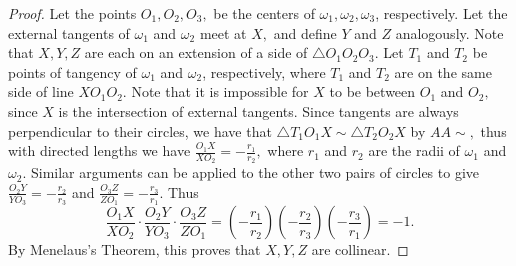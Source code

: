 \documentclass[letterpaper,oneside]{book}
\begin{document}
\begin{proof}
  Let the points $O_1,O_2,O_3,$ be the centers of $\omega_1, \omega_2, \omega_3$, respectively.
  Let the external tangents of $\omega_1$ and $\omega_2$ meet at $X,$ and define $Y$ and $Z$ analogously. Note that $X,Y,Z$ are each on an extension of a side of $\triangle O_1O_2O_3.$ Let $T_1$ and $T_2$ be points of tangency of $\omega_1$ and $\omega_2$, respectively, where $T_1$ and $T_2$ are on the same side of line $XO_1O_2.$ Note that it is impossible for $X$ to be between $O_1$ and $O_2,$ since $X$ is the intersection of external tangents. Since tangents are always perpendicular to their circles, we have that $\triangle T_1O_1X \sim \triangle T_2O_2X$ by $AA\sim,$ thus with directed lengths we have $\frac{O_1X}{XO_2} = -\frac{r_1}{r_2},$ where $r_1$ and $r_2$ are the radii of $\omega_1$ and $\omega_2.$ Similar arguments can be applied to the other two pairs of circles to give $\frac{O_2Y}{YO_3} = -\frac{r_2}{r_3}$ and $\frac{O_3Z}{ZO_1} = -\frac{r_3}{r_1}.$ Thus
  $$\frac{O_1X}{XO_2}\cdot\frac{O_2Y}{YO_3}\cdot\frac{O_3Z}{ZO_1} = \left(-\frac{r_1}{r_2}\right)\left(-\frac{r_2}{r_3}\right)\left(-\frac{r_3}{r_1}\right) = -1.$$ By Menelaus's Theorem, this proves that $X,Y,Z$ are collinear. 
\end{proof}
\end{document}
